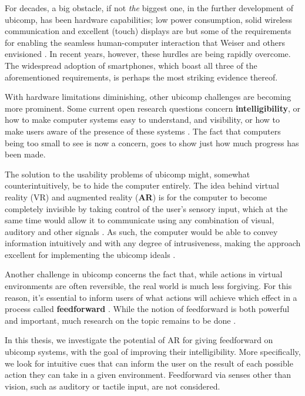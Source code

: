 For decades, a big obstacle, if not \textit{the} biggest one, in the further development of ubicomp, has been hardware capabilities; low power consumption, solid wireless communication and excellent (touch) displays are but some of the requirements for enabling the seamless human-computer interaction that Weiser and others envisioned \cite{weiser1993some}. In recent years, however, these hurdles are being rapidly overcome. The widespread adoption of smartphones, which boast all three of the aforementioned requirements, is perhaps the most striking evidence thereof.

With hardware limitations diminishing, other ubicomp challenges are becoming more prominent. Some current open research questions concern \textbf{intelligibility}, or how to make computer systems easy to understand, and visibility, or how to make users aware of the presence of these systems \cite{vermeulen2009bet,vermeulen2013intelligibility}. The fact that computers being too small to see is now a concern, goes to show just how much progress has been made.

The solution to the usability problems of ubicomp might, somewhat counterintuitively, be to hide the computer entirely. The idea behind virtual reality (VR) and augmented reality (\textbf{AR}) is for the computer to become completely invisible by taking control of the user's sensory input, which at the same time would allow it to communicate using any combination of visual, auditory and other signals \cite{rheingold1991virtual}. As such, the computer would be able to convey information intuitively and with any degree of intrusiveness, making the approach excellent for implementing the ubicomp ideals \cite{weiser1993some}.

Another challenge in ubicomp concerns the fact that, while actions in virtual environments are often reversible, the real world is much less forgiving. For this reason, it's essential to inform users of what actions will achieve which effect in a process called \textbf{feedforward} \cite{djajadiningrat2002but}. While the notion of feedforward is both powerful and important, much research on the topic remains to be done \cite{vermeulen2013crossing}.

In this thesis, we investigate the potential of AR for giving feedforward on ubicomp systems, with the goal of improving their intelligibility. More specifically, we look for intuitive cues that can inform the user on the result of each possible action they can take in a given environment. Feedforward via senses other than vision, such as auditory or tactile input, are not considered.

